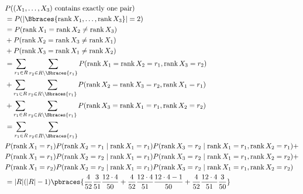 \begin{solution}
\begin{enumerate}[label = (\alph*)]
    \begin{align*}
        &
        P((X_1, \dots, X_3) ~\text{contains exactly one pair}) \\
        & =
        P(|\Bbraces{\operatorname{rank} X_1, \dots, \operatorname{rank} X_3}| = 2) \\
        & =
        P(\operatorname{rank} X_1 = \operatorname{rank} X_2 \neq \operatorname{rank} X_3) \\
        & +
        P(\operatorname{rank} X_2 = \operatorname{rank} X_3 \neq \operatorname{rank} X_1) \\
        & +
        P(\operatorname{rank} X_3 = \operatorname{rank} X_1 \neq \operatorname{rank} X_2) \\
        & =
        \sum_{r_1 \in R} \sum_{r_2 \in R \setminus \Bbraces{r_1}}
            P(\operatorname{rank} X_1 = \operatorname{rank} X_2 = r_1, \operatorname{rank} X_3 = r_2) \\
        & +
        \sum_{r_1 \in R} \sum_{r_2 \in R \setminus \Bbraces{r_1}}
            P(\operatorname{rank} X_2 = \operatorname{rank} X_3 = r_2, \operatorname{rank} X_1 = r_1) \\
        & +
        \sum_{r_1 \in R} \sum_{r_2 \in R \setminus \Bbraces{r_1}}
            P(\operatorname{rank} X_3 = \operatorname{rank} X_1 = r_1, \operatorname{rank} X_2 = r_2) \\
        & =
        \sum_{r_1 \in R} \sum_{r_2 \in R \setminus \Bbraces{r_1}} \\
            & P(\operatorname{rank} X_1 = r_1) P(\operatorname{rank} X_2 = r_1 \mid \operatorname{rank} X_1 = r_1) P(\operatorname{rank} X_3 = r_2 \mid \operatorname{rank} X_1 = r_1, \operatorname{rank} X_2 = r_1)
            + \\
            & P(\operatorname{rank} X_1 = r_1) P(\operatorname{rank} X_2 = r_2 \mid \operatorname{rank} X_1 = r_1) P(\operatorname{rank} X_3 = r_2 \mid \operatorname{rank} X_1 = r_1, \operatorname{rank} X_2 = r_2)
            + \\
            & P(\operatorname{rank} X_1 = r_2) P(\operatorname{rank} X_2 = r_2 \mid \operatorname{rank} X_1 = r_1) P(\operatorname{rank} X_3 = r_2 \mid \operatorname{rank} X_1 = r_1, \operatorname{rank} X_2 = r_2) \\
        & =
        |R| (|R| - 1)
        \pbraces
        {
            \frac{4}{52} \frac{3}{51} \frac{12 \cdot 4}{50}
            +
            \frac{4}{52} \frac{12 \cdot 4}{51} \frac{12 \cdot 4 - 1}{50}
            +
            \frac{4}{52} \frac{12 \cdot 4}{51} \frac{3}{50}
        }
    \end{align*}

\end{enumerate}

\end{solution}

